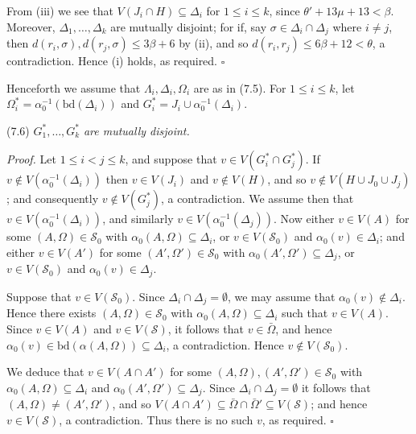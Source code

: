From (iii) we see that $V(J_i \cap H) \subseteq \Delta_i$ for $1 \le i \le k$, since $\theta' + 13\mu + 13 < \beta$. Moreover, $\Delta_1, \dots, \Delta_k$ are mutually disjoint; for if, say $\sigma \in \Delta_i \cap \Delta_j$ where $i \ne j$, then $d(r_i, \sigma), d(r_j, \sigma) \le 3\beta + 6$ by (ii), and so $d(r_i, r_j) \le 6\beta + 12 < \theta$, a contradiction. Hence (i) holds, as required. $\square$

Henceforth we assume that $\Lambda_i, \Delta_i, \Omega_i$ are as in (7.5). For $1 \le i \le k$, let $\Omega_i^* = \alpha_0^{-1}(\text{bd}(\Delta_i))$ and $G_i^* = J_i \cup \alpha_0^{-1}(\Delta_i)$.

\stmt
(7.6) $G^*_1, \dots, G^*_k$ \textit{are mutually disjoint.}

\textit{Proof.} Let $1 \le i < j \le k$, and suppose that $v \in V(G^*_i \cap G^*_j)$. If $v \notin V(\alpha_0^{-1}(\Delta_i))$ then $v \in V(J_i)$ and $v \notin V(H)$, and so $v \notin V(H \cup J_0 \cup J_j)$; and consequently $v \notin V(G^*_j)$, a contradiction. We assume then that $v \in V(\alpha_0^{-1}(\Delta_i))$, and similarly $v \in V(\alpha_0^{-1}(\Delta_j))$. Now either $v \in V(A)$ for some $(A, \Omega) \in \mathcal{S}_0$ with $\alpha_0(A, \Omega) \subseteq \Delta_i$, or $v \in V(\mathcal{S}_0)$ and $\alpha_0(v) \in \Delta_i$; and either $v \in V(A')$ for some $(A', \Omega') \in \mathcal{S}_0$ with $\alpha_0(A', \Omega') \subseteq \Delta_j$, or $v \in V(\mathcal{S}_0)$ and $\alpha_0(v) \in \Delta_j$.

Suppose that $v \in V(\mathcal{S}_0)$. Since $\Delta_i \cap \Delta_j = \emptyset$, we may assume that $\alpha_0(v) \notin \Delta_i$. Hence there exists $(A, \Omega) \in \mathcal{S}_0$ with $\alpha_0(A, \Omega) \subseteq \Delta_i$ such that $v \in V(A)$. Since $v \in V(A)$ and $v \in V(\mathcal{S})$, it follows that $v \in \bar{\Omega}$, and hence $\alpha_0(v) \in \text{bd}(\alpha(A, \Omega)) \subseteq \Delta_i$, a contradiction. Hence $v \notin V(\mathcal{S}_0)$.

We deduce that $v \in V(A \cap A')$ for some $(A, \Omega), (A', \Omega') \in \mathcal{S}_0$ with $\alpha_0(A, \Omega) \subseteq \Delta_i$ and $\alpha_0(A', \Omega') \subseteq \Delta_j$. Since $\Delta_i \cap \Delta_j = \emptyset$ it follows that $(A, \Omega) \ne (A', \Omega')$, and so $V(A \cap A') \subseteq \bar{\Omega} \cap \bar{\Omega}' \subseteq V(\mathcal{S})$; and hence $v \in V(\mathcal{S})$, a contradiction. Thus there is no such $v$, as required. $\square$

